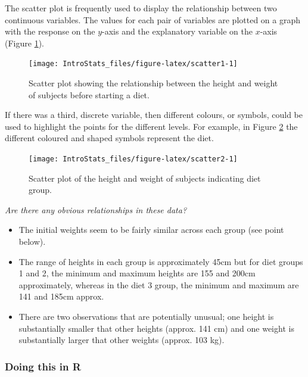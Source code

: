 \documentclass[
  oneside]{krantz}
\begin{document}
The scatter plot is frequently used to display the relationship between two continuous variables. The values for each pair of variables are plotted on a graph with the response on the \(y\)-axis and the explanatory variable on the \(x\)-axis (Figure \ref{fig:scatter1}).

\begin{figure}

{\centering \texttt{[image: IntroStats\_files/figure-latex/scatter1-1]} 

}

\caption{Scatter plot showing the relationship between the height and weight of subjects before starting a diet.}\label{fig:scatter1}
\end{figure}

If there was a third, discrete variable, then different colours, or symbols, could be used to highlight the points for the different levels. For example, in Figure \ref{fig:scatter2} the different coloured and shaped symbols represent the diet.

\begin{figure}

{\centering \texttt{[image: IntroStats\_files/figure-latex/scatter2-1]} 

}

\caption{Scatter plot of the height and weight of subjects indicating diet group.}\label{fig:scatter2}
\end{figure}

\textit{Are there any obvious relationships in these data?}

\begin{itemize}
\item
  The initial weights seem to be fairly similar across each group (see point below).
\item
  The range of heights in each group is approximately 45cm but for diet groups 1 and 2, the minimum and maximum heights are 155 and 200cm approximately, whereas in the diet 3 group, the minimum and maximum are 141 and 185cm approx.
\item
  There are two observations that are potentially unusual; one height is substantially smaller that other heights (approx. 141 cm) and one weight is substantially larger that other weights (approx. 103 kg).
\end{itemize}

\hypertarget{doing-this-in-r-4}{%
\subsubsection{Doing this in R}\label{doing-this-in-r-4}}
\end{document}
